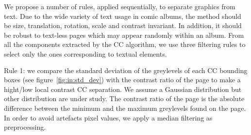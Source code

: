 


We propose a number of rules, applied sequentially, to separate graphics from text. Due to the wide variety of text usage in comic albums, the method should be size, translation, rotation, scale and contrast invariant. In addition, it should be robust to text-less pages which may appear randomly within an album. From all the components extracted by the CC algorithm, we use three filtering rules to select only the ones corresponding to textual elements.




Rule 1: we compare the standard deviation of the greylevels of each CC bounding boxes (see  figure~\ref{fig:in:std_dev}) with the contrast ratio of the page to make a hight/low local contrast CC separation. We assume a Gaussian distribution but other distribution are under study. The contrast ratio of the page is the absolute difference between the minimum and the maximum greylevels found on the page. In order to avoid artefacts pixel values, we apply a median filtering as preprocessing.%

